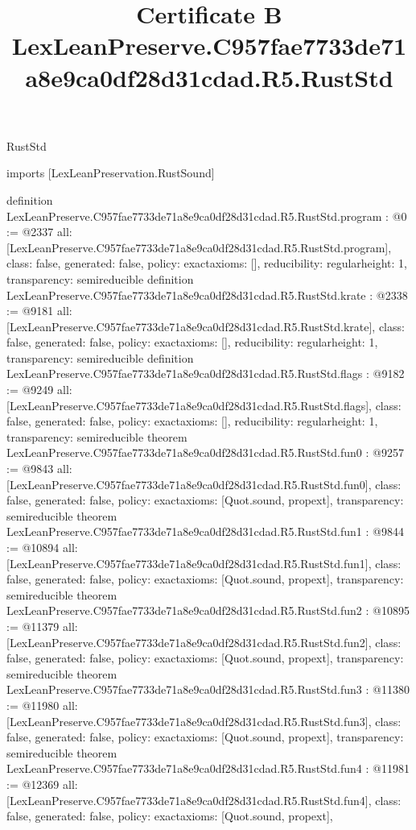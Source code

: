 \begin{lexlean}{RustStd}
\title{Certificate B LexLeanPreserve.C957fae7733de71a8e9ca0df28d31cdad.R5.RustStd}
\begin{coremodule}
imports [LexLeanPreservation.RustSound]

definition LexLeanPreserve.C957fae7733de71a8e9ca0df28d31cdad.R5.RustStd.program : @0 := @2337 {
  all: [LexLeanPreserve.C957fae7733de71a8e9ca0df28d31cdad.R5.RustStd.program],
  class: false,
  generated: false,
  policy: exact{axioms: []},
  reducibility: regular{height: 1},
  transparency: semireducible
}
definition LexLeanPreserve.C957fae7733de71a8e9ca0df28d31cdad.R5.RustStd.krate : @2338 := @9181 {
  all: [LexLeanPreserve.C957fae7733de71a8e9ca0df28d31cdad.R5.RustStd.krate],
  class: false,
  generated: false,
  policy: exact{axioms: []},
  reducibility: regular{height: 1},
  transparency: semireducible
}
definition LexLeanPreserve.C957fae7733de71a8e9ca0df28d31cdad.R5.RustStd.flags : @9182 := @9249 {
  all: [LexLeanPreserve.C957fae7733de71a8e9ca0df28d31cdad.R5.RustStd.flags],
  class: false,
  generated: false,
  policy: exact{axioms: []},
  reducibility: regular{height: 1},
  transparency: semireducible
}
theorem LexLeanPreserve.C957fae7733de71a8e9ca0df28d31cdad.R5.RustStd.fun0 : @9257 := @9843 {
  all: [LexLeanPreserve.C957fae7733de71a8e9ca0df28d31cdad.R5.RustStd.fun0],
  class: false,
  generated: false,
  policy: exact{axioms: [Quot.sound, propext]},
  transparency: semireducible
}
theorem LexLeanPreserve.C957fae7733de71a8e9ca0df28d31cdad.R5.RustStd.fun1 : @9844 := @10894 {
  all: [LexLeanPreserve.C957fae7733de71a8e9ca0df28d31cdad.R5.RustStd.fun1],
  class: false,
  generated: false,
  policy: exact{axioms: [Quot.sound, propext]},
  transparency: semireducible
}
theorem LexLeanPreserve.C957fae7733de71a8e9ca0df28d31cdad.R5.RustStd.fun2 : @10895 := @11379 {
  all: [LexLeanPreserve.C957fae7733de71a8e9ca0df28d31cdad.R5.RustStd.fun2],
  class: false,
  generated: false,
  policy: exact{axioms: [Quot.sound, propext]},
  transparency: semireducible
}
theorem LexLeanPreserve.C957fae7733de71a8e9ca0df28d31cdad.R5.RustStd.fun3 : @11380 := @11980 {
  all: [LexLeanPreserve.C957fae7733de71a8e9ca0df28d31cdad.R5.RustStd.fun3],
  class: false,
  generated: false,
  policy: exact{axioms: [Quot.sound, propext]},
  transparency: semireducible
}
theorem LexLeanPreserve.C957fae7733de71a8e9ca0df28d31cdad.R5.RustStd.fun4 : @11981 := @12369 {
  all: [LexLeanPreserve.C957fae7733de71a8e9ca0df28d31cdad.R5.RustStd.fun4],
  class: false,
  generated: false,
  policy: exact{axioms: [Quot.sound, propext]},
}
\end{coremodule}
\end{lexlean}
